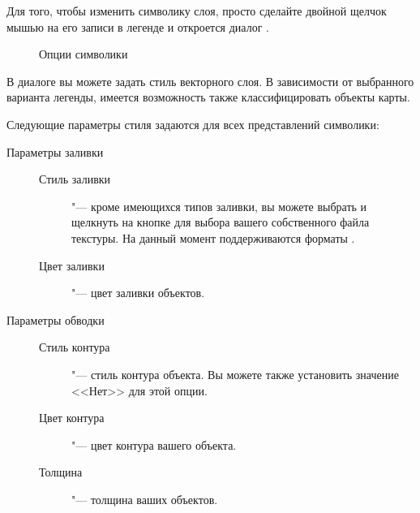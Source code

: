 Для того, чтобы изменить символику слоя, просто сделайте двойной щелчок
мышью на его записи в легенде и откроется диалог .

\begin{figure}[ht]
\centering
   \hspace{1cm}
   \hspace{1cm}
   \hspace{1cm}
\caption{Опции символики \wincaption}
\end{figure}


 \label{sec:style_options} 
В диалоге вы можете задать стиль векторного слоя. В зависимости от
выбранного варианта легенды, имеется возможность также классифицировать
объекты карты.

Следующие параметры стиля задаются для всех представлений символики:
\begin{description}
\item[Параметры заливки]
\begin{description}
 \item[Стиль заливки] "--- кроме имеющихся типов заливки, вы
 можете выбрать  и щелкнуть на
 кнопке \browsebutton для выбора вашего собственного файла текстуры. На
 данный момент поддерживаются форматы .
 \item[Цвет заливки] "--- цвет заливки объектов.
\end{description}
\item[Параметры обводки]
\begin{description}
 \item[Стиль контура] "--- стиль контура объекта. Вы можете
 также установить значение <<Нет>> для этой опции.
 \item[Цвет контура] "--- цвет контура вашего объекта.
 \item[Толщина] "--- толщина ваших объектов.
\end{description}
\end{description}

